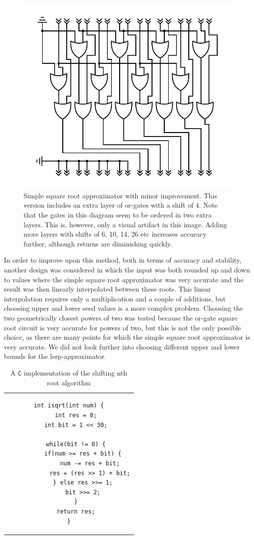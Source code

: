 			\begin{figure}
				\centering
				\caption{Simple square root approximator with minor improvement.
					This version includes an extra layer of or-gates with a
					shift of 4. Note that the gates in this diagram seem
					to be ordered in two extra layers. This is, however, only a
					visual artifact in this image. Adding more layers with
					shifts of 6, 10, 14, 26 etc increases accuracy further,
					although returns are diminishing quickly.}
				\label{orsqrt2}
				\includegraphics[width=0.75\linewidth]{figure/pdf/sqrt2Or.pdf} 
			\end{figure}

			In order to improve upon this method, both in terms of accuracy and
			stability, another design was considered in which the input was
			both rounded up and down to values where the simple square root
			approximator was very accurate and the result was then linearly
			interpolated between these roots. This linear interpolation
			requires only a multiplication and a couple of additions, but
			choosing upper and lower seed values is a more complex problem.
			Choosing the two geometrically closest powers of two was tested
			because the or-gate square root circuit is very accurate for powers
			of two, but this is not the only possible choice, as there are many 
			points for which the simple square root approximator is very 
			accurate. We did not look further into choosing different upper and
			lower bounds for the lerp-approximator.

			\begin{table}
				\centering
				\caption{A \texttt{C} implementation of the shifting nth root 
					algorithm}
				\label{sqrtc}
				\begin{tabular}{c}
				\begin{lstlisting}
int isqrt(int num) {
    int res = 0;
    int bit = 1 << 30;

    while(bit != 0) {
        if(num >= res + bit) {
            num -= res + bit;
            res = (res >> 1) + bit;
        } else res >>= 1;
        bit >>= 2;
    }
    return res;
}
				\end{lstlisting}
				\end{tabular}
			\end{table}

